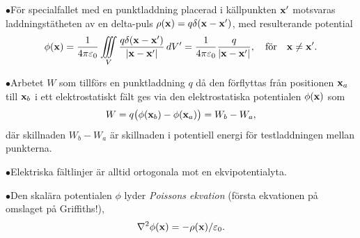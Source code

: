 \item{$\bullet$}{F{\"o}r specialfallet med en punktladdning placerad i
  k{\"a}llpunkten ${\bf x}'$ motsvaras laddningst{\"a}theten av en
  delta-puls $\rho({\bf x})=q\delta({\bf x}-{\bf x}')$, med resulterande
  potential
  $$
    \phi({\bf x})
      ={{1}\over{4\pi\varepsilon_0}}\iiint_V
        {{q\delta({\bf x}-{\bf x}')}\over{|{\bf x}-{\bf x}'|}}\,dV'
      ={{1}\over{4\pi\varepsilon_0}}{{q}\over{|{\bf x}-{\bf x}'|}},
        \quad\hbox{f{\"o}r}\quad{\bf x}\ne{\bf x}'.
  $$}
\item{$\bullet$}{Arbetet $W$ som tillf{\"o}rs en punktladdning $q$ d{\aa}
  den f{\"o}rflyttas fr{\aa}n positionen ${\bf x}_a$ till ${\bf x}_b$
  i ett elektrostatiskt f{\"a}lt ges via den elektrostatiska potentialen
  $\phi({\bf x})$ som
  $$
    W=q\big(\phi({{\bf x}_b})-\phi({{\bf x}_a})\big)=W_b-W_a,
  $$
  d{\"a}r skillnaden $W_b-W_a$ {\"a}r skillnaden i potentiell energi f{\"o}r
  testladdningen mellan punkterna.}
\item{$\bullet$}{Elektriska f{\"a}ltlinjer {\"a}r alltid ortogonala mot
  en ekvipotentialyta.}
\item{$\bullet$}{Den skal{\"a}ra potentialen $\phi$ lyder {\it Poissons
  ekvation} (f{\"o}rsta ekvationen p{\aa} omslaget p{\aa} Griffiths!),
  $$
    \nabla^2\phi({\bf x})=-\rho({\bf x})/\varepsilon_0.
  $$}
\index
\bye
